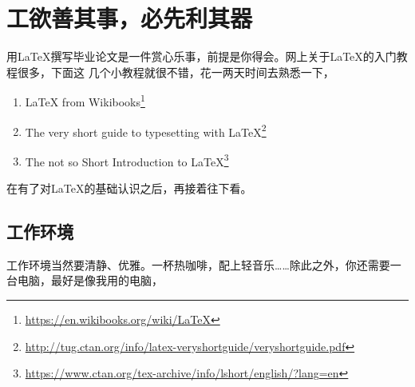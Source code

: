 \chapter{工欲善其事，必先利其器}
\label{cha:pre-requisite}

用\LaTeX{}撰写毕业论文是一件赏心乐事，前提是你得会。网上关于\LaTeX{}的入门教程很多，下面这
几个小教程就很不错，花一两天时间去熟悉一下，

\begin{enumerate}
\item \LaTeX{} from Wikibooks\footnote{\url{https://en.wikibooks.org/wiki/LaTeX}}
\item The very short guide to typesetting with
  \LaTeX{}\footnote{\url{http://tug.ctan.org/info/latex-veryshortguide/veryshortguide.pdf}}
\item The not so Short Introduction to
  \LaTeX{}\footnote{\url{https://www.ctan.org/tex-archive/info/lshort/english/?lang=en}}
\end{enumerate}

在有了对\LaTeX{}的基础认识之后，再接着往下看。

\section{工作环境}
\label{sec:env}

工作环境当然要清静、优雅。一杯热咖啡，配上轻音乐……除此之外，你还需要一台电脑，最好是像我用的电脑，

